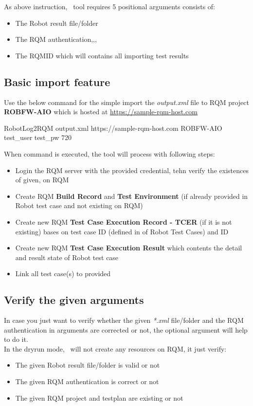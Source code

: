 As above instruction, \pkg\ tool requires 5 positional arguments consists of:
\begin{itemize}
  \item The Robot result file/folder
  \item The RQM authentication,,,
  \item The RQMID which will contains all importing test results
\end{itemize}

\subsection{Basic import feature}
Use the below command for the simple import the \emph{output.xml} file to RQM
project \textbf{ROBFW-AIO} which is hosted at
\href{https://sample-rqm-host.com}{https://sample-rqm-host.com}
\begin{robotlog}
RobotLog2RQM output.xml https://sample-rqm-host.com ROBFW-AIO test_user test_pw 720
\end{robotlog}

When command is executed, the tool will process with following steps:
\begin{itemize}
\item Login the RQM server with the provided credential, tehn verify the
      existences of given, on RQM
\item Create RQM \textbf{Build Record} and \textbf{Test Environment} (if already
      provided in Robot test case and not existing on RQM)
\item Create new RQM \textbf{Test Case Execution Record - TCER}
      (if it is not existing) bases on test case ID (defined  in
      \rcode{[Tags]} of Robot Test Cases) and  ID
\item Create new RQM \textbf{Test Case Execution Result} which contents
      the detail and result state of Robot test case
\item Link all test case(s) to provided 
\end{itemize}

\subsection{Verify the given arguments}
In case you just want to verify whether the given \emph{*.xml} file/folder and
the RQM authentication in arguments are corrected or not, the optional argument
 will help to do it.
\\
In the dryrun mode, \pkg\ will not create any resources on RQM, it
just verify:
\begin{itemize}
  \item The given Robot result file/folder is valid or not
  \item The given RQM authentication is correct or not
  \item The given RQM project and testplan are existing or not
\end{itemize}

